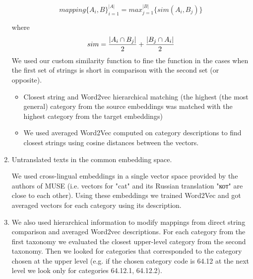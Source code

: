 \documentclass[conference]{IEEEtran}
\begin{document}
\begin{enumerate}
$$mapping\{A_i, B\}_{i=1}^{|A|} = max_{j=1}^{|B|}\{sim(A_i,B_j)\}$$

where $$sim = \dfrac{|A_i \cap B_j|}{2} + \\ \dfrac{|B_j \cap A_i|}{2} $$
We used our custom similarity function to fine the function in the cases when the first set of strings is short in comparison with the second set (or opposite).
\begin{itemize}
\item Closest string and Word2vec hierarchical matching (the highest (the most general) category from the source embeddings was matched with the highest category from the target embeddings)
\item We used averaged Word2Vec computed on category descriptions  to find closest strings using cosine distances between the vectors.
\end{itemize}
\item Untranslated texts in the common embedding space.

We used cross-lingual embeddings in a single vector space provided by the authors of MUSE (i.e. vectors for "cat" and its Russian translation \foreignlanguage{russian}{"кот"} are close to each other). Using these embeddings we trained Word2Vec and got averaged vectors for each category using its description.
\item We also used hierarchical information to modify mappings from direct string comparison and averaged Word2vec descriptions. For each category from the first taxonomy we evaluated the closest upper-level category from the second taxonomy. Then we looked for categories that corresponded to the category chosen at the upper level (e.g. if the chosen category code is 64.12 at the next level we look only for categories 64.12.1, 64.12.2).
\end{enumerate}
\end{document}
